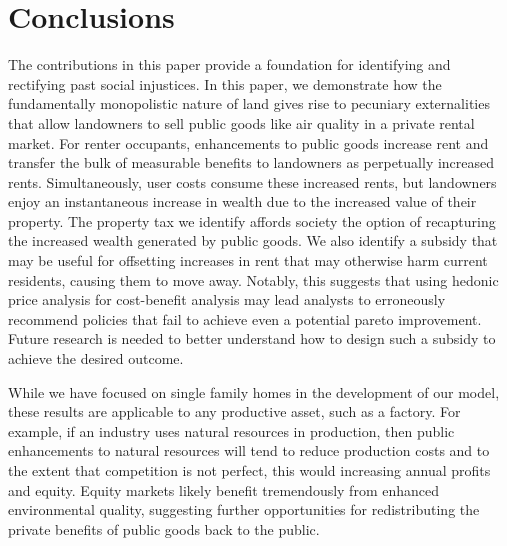 \documentclass[ecta,nameyear,draft]{econsocart}
\theoremstyle{plain}
\theoremstyle{remark}
\begin{document}
\section{Conclusions}
The contributions in this paper provide a foundation for identifying and rectifying past social injustices. In this paper, we demonstrate how the fundamentally monopolistic nature of land gives rise to pecuniary externalities that allow landowners to sell public goods like air quality in a private rental market. For renter occupants, enhancements to public goods increase rent and transfer the bulk of measurable benefits to landowners as perpetually increased rents. Simultaneously, user costs consume these increased rents, but landowners enjoy an instantaneous increase in wealth due to the increased value of their property. The property tax we identify affords society the option of recapturing the increased wealth generated by public goods. We also identify a subsidy that may be useful for offsetting increases in rent that may otherwise harm current residents, causing them to move away. Notably, this suggests that using hedonic price analysis for cost-benefit analysis may lead analysts to erroneously recommend policies that fail to achieve even a potential pareto improvement. Future research is needed to better understand how to design such a subsidy to achieve the desired outcome.

While we have focused on single family homes in the development of our model, these results are applicable to any productive asset, such as a factory. For example, if an industry uses natural resources in production, then public enhancements to natural resources will tend to reduce production costs and to the extent that competition is not perfect, this would increasing annual profits and equity. Equity markets likely benefit tremendously from enhanced environmental quality, suggesting further opportunities for redistributing the private benefits of public goods back to the public.
 
\end{document}

